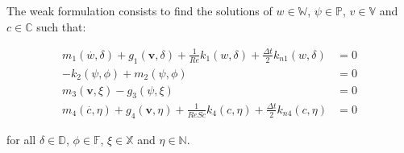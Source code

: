 \noindent
The weak formulation consists 
to find the solutions of 
$w \in \mathbb{W}$,
$\psi \in \mathbb{P}$, $v \in \mathbb{V}$ and $c \in \mathbb{C}$
such that:

\begin{align}
 \textbf{$m_1$}(\overset{.}{w},\delta) + \textbf{$g_1$}(\textbf{v},\delta) 
 + \frac{1}{\textit{Re}}\textbf{$k_1$}(w,\delta) + \frac{\Delta t}{2} \textbf{$k_{n1}$}(w,\delta) &= 0 \\
 -\textbf{$k_2$}(\psi,\phi) + \textbf{$m_2$}(\psi,\phi) &= 0 \\
  \textbf{$m_3$}(\textbf{v},\xi) - \textbf{$g_3$}(\psi,\xi) &= 0 \\
 \textbf{$m_4$}(\overset{.}{c},\eta) + \textbf{$g_4$}(\textbf{v},\eta) 
 + \frac{1}{\textit{ReSc}}\textbf{$k_4$}(c,\eta) +\frac{\Delta t}{2} \textbf{$k_{n4}$}(c,\eta) &= 0
\end{align}


\noindent
for all $\delta \in \mathbb{D}$, $\phi \in \mathbb{F}$, 
$\xi \in \mathbb{X}$ and $\eta \in \mathbb{N}$.
